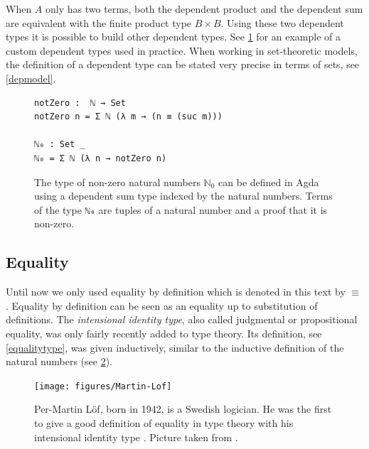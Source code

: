 \documentclass[12pt,a4paper,twoside,xetex]{book}
\newcommand{\keyword}[1]{\emph{#1}\index{#1}}
\begin{document}



When $A$ only has two terms, both the dependent product and the dependent sum are equivalent with the finite product type $B \times B$. Using these two dependent types it is possible to build other dependent types. See \cref{non-zeroNats} for an example of a custom dependent types used in practice. When working in set-theoretic models, the definition of a dependent type can be stated very precise in terms of sets, see \cref{depmodel}.

\begin{figure}\label{non-zeroNats}
\centering
\begin{BVerbatim}
notZero :  ℕ → Set
notZero n = Σ ℕ (λ m → (n ≡ (suc m)))

ℕ₀ : Set _
ℕ₀ = Σ ℕ (λ n → notZero n)
\end{BVerbatim}
\caption{The type of non-zero natural numbers $\mathbb{N}_0$ can be defined in Agda using a dependent sum type indexed by the natural numbers. Terms of the type \texttt{ℕ₀} are tuples of a natural number and a proof that it is non-zero.}
\end{figure}


\subsection{Equality}

Until now we only used equality by definition which is denoted in this text by $\equiv$. Equality by definition can be seen as an equality up to substitution of definitions. The \keyword{intensional identity type}, also called judgmental or propositional equality, was only fairly recently added to type theory. Its definition, see \cref{equalitytype},  was given inductively, similar to the inductive definition of the natural numbers (see  \cref{fig:Per-Martin-L=0000F6f-presenting}).

\begin{figure}
  \centering{}
  \texttt{[image: figures/Martin-Lof]}
  \caption{\label{fig:Per-Martin-L=0000F6f-presenting}
    Per-Martin Löf, born in 1942, is a Swedish logician. He was the first to give a good definition of equality in type theory with his intensional identity type \cite{Martin-Loef1975}. Picture taken from  \cite{Academia2013}.}
\end{figure}
\end{document}
